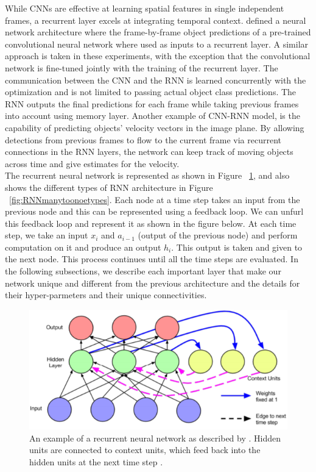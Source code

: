 While CNNs are effective at learning spatial features in single independent frames, a recurrent layer excels at integrating temporal context. \cite{tripathi2016context} defined a neural network architecture where the frame-by-frame object predictions of a pre-trained convolutional neural network where used as inputs to a recurrent layer. A similar approach is taken in these experiments, with the exception that the convolutional network is fine-tuned jointly with the training of the recurrent layer. The communication between the CNN and the RNN is learned concurrently with the optimization and is not limited to passing actual object class predictions. The RNN outputs the final predictions for each frame while taking previous frames into account using memory layer. Another example of CNN-RNN model, is the capability of predicting objects’ velocity vectors in the image plane. By allowing detections from previous frames to flow to the current frame via recurrent connections in the RNN layers, the network can keep track of moving objects across time and give estimates for the velocity.\\

The recurrent neural network is represented as shown in Figure ~\ref{fig:gap1}, and also shows the different types of RNN architecture in Figure ~\ref{fig:RNNmanytoonoetypes}. Each node at a time step takes an input from the previous node and this can be represented using a feedback loop. We can unfurl this feedback loop and represent it as shown in the figure below. At each time step, we take an input $x_{i}$ and $a_{i-1}$ (output of the previous node) and perform computation on it and produce an output $h_{i}$. This output is taken and given to the next node. This process continues until all the time steps are evaluated. In the following subsections, we describe each important layer that make our network unique and different from the previous architecture and the details for their hyper-parmeters and their unique connectivities.

\begin{figure}[ht]
\centering
\includegraphics[width=0.60\columnwidth]{Figures/rnn}
\decoRule
\caption[An example of a recurrent neural network as described by \cite{elman1990finding}. Hidden
units are connected to context units, which feed back into the hidden units at
the next time step \citep{lipton2015critical}.]{An example of a recurrent neural network as described by \cite{elman1990finding}. Hidden
units are connected to context units, which feed back into the hidden units at
the next time step \citep{lipton2015critical}.}
\label{fig:gap1}
\end{figure}


